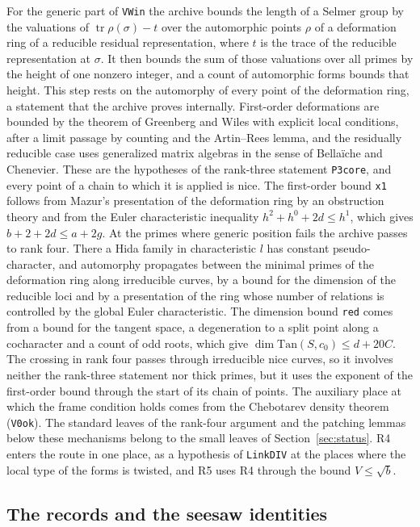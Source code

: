 \documentclass[11pt,letterpaper]{article}
\numberwithin{equation}{section}
\begin{document}
For the generic part of \texttt{VWin} the archive bounds the length of a Selmer group by the valuations of $\operatorname{tr}\rho(\sigma)-t$ over the automorphic points $\rho$ of a deformation ring of a reducible residual representation, where $t$ is the trace of the reducible representation at $\sigma$. It then bounds the sum of those valuations over all primes by the height of one nonzero integer, and a count of automorphic forms bounds that height. This step rests on the automorphy of every point of the deformation ring, a statement that the archive proves internally. First-order deformations are bounded by the theorem of Greenberg and Wiles with explicit local conditions, after a limit passage by counting and the Artin--Rees lemma, and the residually reducible case uses generalized matrix algebras in the sense of Bella\"iche and Chenevier. These are the hypotheses of the rank-three statement \texttt{P3core}, and every point of a chain to which it is applied is nice. The first-order bound \texttt{x1} follows from Mazur's presentation of the deformation ring by an obstruction theory and from the Euler characteristic inequality $h^2+h^0+2d\le h^1$, which gives $b+2+2d\le a+2g$. At the primes where generic position fails the archive passes to rank four. There a Hida family in characteristic $l$ has constant pseudo-character, and automorphy propagates between the minimal primes of the deformation ring along irreducible curves, by a bound for the dimension of the reducible loci and by a presentation of the ring whose number of relations is controlled by the global Euler characteristic. The dimension bound \texttt{red} comes from a bound for the tangent space, a degeneration to a split point along a cocharacter and a count of odd roots, which give $\dim\mathrm{Tan}(S,c_0)\le d+20C$. The crossing in rank four passes through irreducible nice curves, so it involves neither the rank-three statement nor thick primes, but it uses the exponent of the first-order bound through the start of its chain of points. The auxiliary place at which the frame condition holds comes from the Chebotarev density theorem (\texttt{V0ok}). The standard leaves of the rank-four argument and the patching lemmas below these mechanisms belong to the small leaves of Section~\ref{sec:status}. R4 enters the route in one place, as a hypothesis of \texttt{LinkDIV} at the places where the local type of the forms is twisted, and R5 uses R4 through the bound $V\le\sqrt b$.

\subsection{The records and the seesaw identities}\label{sec:records}
\end{document}
